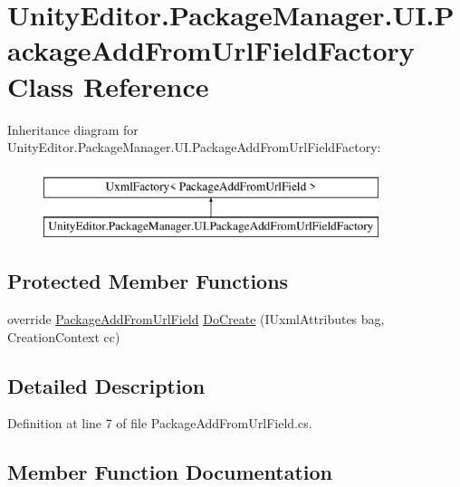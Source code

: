 \hypertarget{class_unity_editor_1_1_package_manager_1_1_u_i_1_1_package_add_from_url_field_factory}{}\section{Unity\+Editor.\+Package\+Manager.\+U\+I.\+Package\+Add\+From\+Url\+Field\+Factory Class Reference}
\label{class_unity_editor_1_1_package_manager_1_1_u_i_1_1_package_add_from_url_field_factory}
Inheritance diagram for Unity\+Editor.\+Package\+Manager.\+U\+I.\+Package\+Add\+From\+Url\+Field\+Factory\+:\begin{figure}[H]
\begin{center}
\leavevmode
\includegraphics[height=2.000000cm]{class_unity_editor_1_1_package_manager_1_1_u_i_1_1_package_add_from_url_field_factory}
\end{center}
\end{figure}
\subsection*{Protected Member Functions}
\begin{DoxyCompactItemize}
\item 
override \mbox{\hyperlink{class_unity_editor_1_1_package_manager_1_1_u_i_1_1_package_add_from_url_field}{Package\+Add\+From\+Url\+Field}} \mbox{\hyperlink{class_unity_editor_1_1_package_manager_1_1_u_i_1_1_package_add_from_url_field_factory_ae9cfc5bd6ff95cdb4fd81d1039c2bd48}{Do\+Create}} (I\+Uxml\+Attributes bag, Creation\+Context cc)
\end{DoxyCompactItemize}


\subsection{Detailed Description}


Definition at line 7 of file Package\+Add\+From\+Url\+Field.\+cs.



\subsection{Member Function Documentation}
\mbox{\label{class_unity_editor_1_1_package_manager_1_1_u_i_1_1_package_add_from_url_field_factory_ae9cfc5bd6ff95cdb4fd81d1039c2bd48}} 
